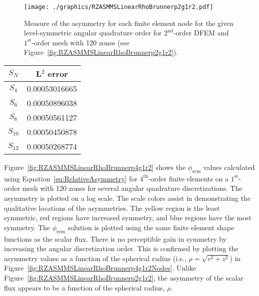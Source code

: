 \documentclass[12pt]{article}
\begin{document}
\begin{figure}[!htb]
\centering
\texttt{[image: ./graphics/RZASMMSLinearRhoBrunnerp2g1r2.pdf]}
\caption{Measure of the asymmetry for each finite element node for the given level-symmetric angular quadrature order for $2^\text{nd}$-order DFEM and $1^\text{st}$-order mesh with 120 zones (see Figure~\ref{fig:RZASMMSLinearRhoBrunnerp2g1r2}).}
\label{fig:RZASMMSLinearRhoBrunnerp2g1r2Nodes}
\end{figure}

\begin{table}[!htb]
\centering
{\renewcommand{\arraystretch}{1.5}
\begin{tabular}{|c|c|}
\hline
$S_N$ & L$^2$ error \\\hline
$S_4$ & 0.00053016665 \\\hline
$S_6$ & 0.00050896038 \\\hline
$S_8$ & 0.00050561127 \\\hline
$S_{10}$ & 0.00050450878 \\\hline
$S_{12}$ & 0.00050268774 \\\hline
\end{tabular}}
\end{table}

\FloatBarrier

Figure~\ref{fig:RZASMMSLinearRhoBrunnerp4g1r2} shows the $\phi_\text{sym}$ values calculated using Equation~\ref{eq:RelativeAsymmetry} for $4^\text{th}$-order finite elements on a $1^\text{st}$-order mesh with 120 zones for several angular quadrature discretizations. The asymmetry is plotted on a log scale. The scale colors assist in demonstrating the qualitative locations of the asymmetries. The yellow region is the least symmetric, red regions have increased symmetry, and blue regions have the most symmetry. The $\phi_\text{sym}$ solution is plotted using the same finite element shape functions as the scalar flux. There is no perceptible gain in symmetry by increasing the angular discretization order. This is confirmed by plotting the asymmetry values as a function of the spherical radius (i.e., $\rho=\sqrt{r^2+z^2}$) in Figure~\ref{fig:RZASMMSLinearRhoBrunnerp4g1r2Nodes}. Unlike Figure~\ref{fig:RZASMMSLinearRhoBrunnerp2g1r2}, the asymmetry of the scalar flux appears to be a function of the spherical radius, $\rho$.
\end{document}
